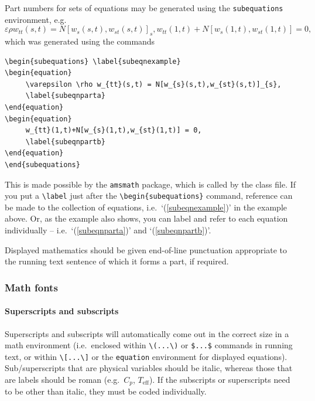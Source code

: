 \documentclass[]{interact}
\theoremstyle{plain}%
\theoremstyle{definition}
\theoremstyle{remark}
\begin{document}
Part numbers for sets of equations may be generated using the \texttt{subequations} environment, e.g.
\begin{subequations} \label{subeqnexample}
\begin{equation}
     \varepsilon \rho w_{tt}(s,t) = N[w_{s}(s,t),w_{st}(s,t)]_{s},
     \label{subeqnparta}
\end{equation}
\begin{equation}
     w_{tt}(1,t)+N[w_{s}(1,t),w_{st}(1,t)] = 0,
     \label{subeqnpartb}
\end{equation}
\end{subequations}
which was generated using the commands
\begin{verbatim}
\begin{subequations} \label{subeqnexample}
\begin{equation}
     \varepsilon \rho w_{tt}(s,t) = N[w_{s}(s,t),w_{st}(s,t)]_{s},
     \label{subeqnparta}
\end{equation}
\begin{equation}
     w_{tt}(1,t)+N[w_{s}(1,t),w_{st}(1,t)] = 0,
     \label{subeqnpartb}
\end{equation}
\end{subequations}
\end{verbatim}
This is made possible by the \texttt{amsmath} package, which is called by the class file. If you put a \verb"\label" just after the \verb"\begin{subequations}" command, reference can be made to the collection of equations, i.e.\ `(\ref{subeqnexample})' in the example above. Or, as the example also shows, you can label and refer to each equation individually -- i.e.\ `(\ref{subeqnparta})' and `(\ref{subeqnpartb})'.

Displayed mathematics should be given end-of-line punctuation appropriate to the running text sentence of which it forms a part, if required.

\subsubsection{Math fonts}

\paragraph{Superscripts and subscripts}
Superscripts and subscripts will automatically come out in the correct size in a math environment (i.e.\ enclosed within \verb"\(...\)" or \verb"$...$" commands in running text, or within \verb"\[...\]" or the \texttt{equation} environment for displayed equations). Sub/superscripts that are physical variables should be italic, whereas those that are labels should be roman (e.g.\ $C_p$, $T_\mathrm{eff}$). If the subscripts or superscripts need to be other than italic, they must be coded individually.
\end{document}
